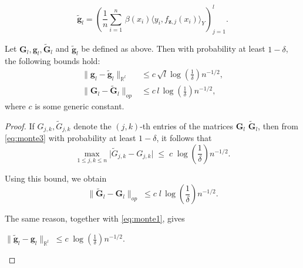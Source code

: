 \documentclass[twoside,11pt]{article}
\begin{document}
\begin{equation}\label{agg g}
\tilde{\mathbf{g}}_l 
= \left( \frac{1}{n} \sum_{i=1}^{n} 
   \, \beta(x_i) \langle y_i,f_{\mathbf{z},j}(x_i)\rangle_{Y} \right)_{j=1}^{l}.
\end{equation}





\vspace{0.5em}

\begin{proposition}
Let $\mathbf{G}_l,\mathbf{g}_l,\tilde{\mathbf{G}}_l$ and $\tilde{\mathbf{g}}_l$ be defined as above. Then with probability at least $1-\delta$, the following bounds hold:
\begin{align}
\big\| \textbf{g}_l - \tilde{\textbf{g}}_l \big\|_{\mathbb{R}^l} 
&\leq c \, \sqrt{l}\log \left( \frac{1}{\delta} \right) n^{-1/2} , \label{eq:g-bound}\\[0.6em]
\big\| \textbf{G}_l - \widetilde{\textbf{G}}_l \big\|_{op} 
&\leq c \, l\,\log  \left( \frac{1}{\delta} \right) n^{-1/2}  
, \label{eq:G-bound}
\end{align}
where $c$ is some generic constant.
\end{proposition}






\noindent

\begin{proof}
If $G_{j,k}, \tilde{G}_{j,k}$ denote the $(j,k)$-th entries of the matrices $\textbf{G}_l$ $\tilde{\textbf{G}}_l$, then from \eqref{eq:monte3} with probability at least $1-\delta$, it follows that
\begin{equation*}
\max_{1 \leq j,k \leq n} 
   \big| \tilde{G}_{j,k} - G_{j,k} \big|
   \;\leq\; c \; \log  \left( \frac{1}{\delta} \right) n^{-1/2}  .
\end{equation*}

\noindent
Using this bound, we obtain
\begin{equation*}
\big\| \widetilde{\textbf{G}}_l - \textbf{G}_l \big\|_{op} 
   \;\leq c\; l  \, \log  \left( \frac{1}{\delta} \right) n^{-1/2}  .
\end{equation*}

\noindent
The same reason, together with  \eqref{eq:monte1}, gives
\begin{center}
$\big\| \tilde{\textbf{g}}_l - \textbf{g}_l \big\|_{\mathbb{R}^l} 
   \;\leq c\; \log  \left( \frac{1}{\delta} \right) n^{-1/2} .$
\end{center}

\end{proof}
\end{document}
